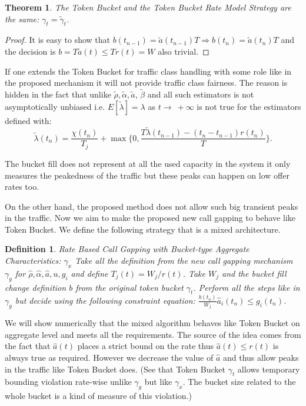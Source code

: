 \documentclass[conference]{IEEEtran}
\newtheorem{theorem}{Theorem}
\newtheorem{definition}{Definition}
\newcommand{\toinf}{\rightarrow~+\infty}
\begin{document}
\begin{theorem}
The Token Bucket and the Token Bucket Rate Model Strategy are the
same: $\gamma_t=\tilde{\gamma}_t$.
\end{theorem}

\begin{proof} It is easy to show that $b(t_{n-1})=\tilde{a}(t_{n-1}) T
\Rightarrow b(t_n)=\tilde{a}(t_n) T$ and the decision is $b=T
\tilde{a}(t)\leq T r(t)=W$ also trivial.\end{proof}

If one extends the Token Bucket for traffic class handling with some
role like in the proposed mechanism it will not provide traffic
class fairness. The reason is hidden in the fact that unlike
$\tilde{\rho},\tilde{\alpha},\tilde{a}$, $\tilde{\beta}$ and all
such estimators is not asymptotically unbiased i.e.
$E[\tilde{\lambda}]=\lambda$ as $t\toinf$ is not true for the
estimators defined with:
\begin{equation}\label{eq:rate-statistics-bucket}
\tilde{\lambda}(t_n)=\frac{\chi(t_n)}{T_j}+\max\{0,\frac{T
\tilde{\lambda}(t_{n-1})-(t_n-t_{n-1})r(t_n)}{T}\}.
\end{equation}

The bucket fill does not represent at all the used capacity in the
system it only measures the peakedness of the traffic but these
peaks can happen on low offer rates too.

On the other hand, the proposed method does not allow such big
transient peaks in the traffic. Now we aim to make the proposed new
call gapping to behave like Token Bucket. We define the following
strategy that is a mixed architecture.

\begin{definition}
Rate Based Call Gapping with Bucket-type Aggregate Characteristics:
$\gamma_x$ Take all the definition from the new call gapping
mechanism $\gamma_g$ for $\hat{\rho},\hat{\alpha},\hat{a},u,g_i$ and
define $T_j(t)=W_j/r(t)$. Take $W_j$ and the bucket fill change
definition $b$ from the original token bucket $\gamma_t$. Perform
all the steps like in $\gamma_g$ but decide using the following
constraint equation: $\frac{b(t_n)}{W_j}\hat{a}_i(t_n)\leq
g_i(t_n)$.
\end{definition}

We will show numerically that the mixed algorithm behaves like Token
Bucket on aggregate level and meets all the requirements. The source
of the idea comes from the fact that $\hat{a}(t)$ places a strict
bound on the rate thus $\hat{a}(t)\leq r(t)$ is always true as
required. However we decrease the value of $\hat{a}$ and thus allow
peaks in the traffic like Token Bucket does. (See that Token Bucket
$\gamma_t$ allows temporary bounding violation rate-wise unlike
$\gamma_g$ but like $\gamma_x$. The bucket size related to the whole
bucket is a kind of measure of this violation.)
\end{document}
